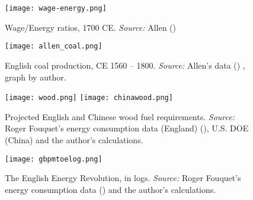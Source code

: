 \documentclass[12pt]{article}
\numberwithin{equation}{section}
\begin{document}
		\begin{figure}[htb]
		\centering
		\texttt{[image: wage-energy.png]}
		\caption{Wage/Energy ratios, 1700 CE. \textit{Source:} Allen (\citeyear{allen_british_2009})}
		\label{fig:allen_ratios}
		\end{figure}
		
		\begin{figure}[htb]
		\centering
		\texttt{[image: allen\_coal.png]}
		\caption{English coal production, CE 1560 -- 1800. \textit{Source:} Allen's data (\citeyear{allen_british_2009}) , graph by author.}
		\label{fig:allen_coal}
		\end{figure}

		\begin{figure}[ftb]
		\centerline{
		\mbox{\texttt{[image: wood.png]}}
		\mbox{\texttt{[image: chinawood.png]}}
		}
		\caption{Projected English and Chinese wood fuel requirements. \textit{Source:} Roger Fouquet's energy consumption data (England) (\citeyear{fouquet_heat_2008}), U.S. DOE (China) and the author's calculations.} 
		\label{fig:eng_wood}
		\end{figure}
		

		\begin{figure}[ftb]
		\centering
		\texttt{[image: gbpmtoelog.png]}
		\caption{The English Energy Revolution, in logs. \textit{Source:} Roger Fouquet's energy consumption data (\citeyear{fouquet_heat_2008}) and the author's calculations.} 
		\label{fig:mtoe_log}
		\end{figure} 		


\listoffigures

		
		
\end{document}
